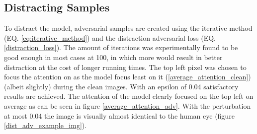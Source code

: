 \subsection*{Distracting Samples}
To distract the model, adversarial samples are created using the iterative method (EQ. \ref{eq:iterative_method}) and the distraction adversarial loss (EQ. \ref{distraction_loss}). The amount of iterations was experimentally found to be good enough in most cases at 100, in which more would result in better distraction at the cost of longer running times. The top left pixel was chosen to focus the attention on as the model focus least on it (\ref{average_attention_clean}) (albeit slightly) during the clean images. With an epsilon of 0.04 satisfactory results are achieved. The attention of the model clearly focused on the top left on average as can be seen in figure \ref{average_attention_adv}. With the perturbation at most 0.04 the image is visually almost identical to the human eye (figure \ref{dist_adv_example_img}).

